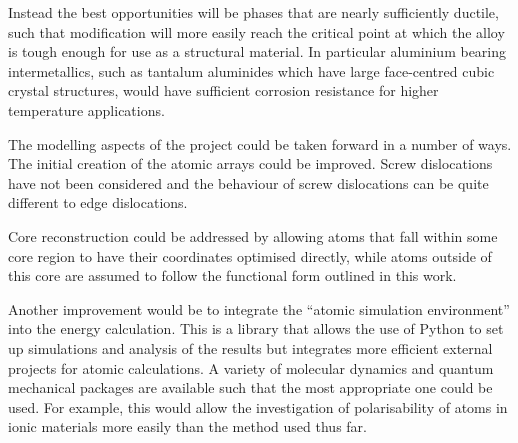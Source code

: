Instead the best opportunities will be phases that are nearly sufficiently ductile, such that modification will more easily reach the critical point at which the alloy is tough enough for use as a structural material. In particular aluminium bearing intermetallics, such as tantalum aluminides which have large face-centred cubic crystal structures, would have sufficient corrosion resistance for higher temperature applications.

The modelling aspects of the project could be taken forward in a number of ways. The initial creation of the atomic arrays could be improved. Screw dislocations have not been considered and the behaviour of screw dislocations can be quite different to edge dislocations. 

Core reconstruction could be addressed by allowing atoms that fall within some core region to have their coordinates optimised directly, while atoms outside of this core are assumed to follow the functional form outlined in this work.

Another improvement would be to integrate the ``atomic simulation environment'' into the energy calculation. This is a library that allows the use of Python to set up simulations and analysis of the results but integrates more efficient external projects for atomic calculations. A variety of molecular dynamics and quantum mechanical packages are available such that the most appropriate one could be used. For example, this would allow the investigation of polarisability of atoms in ionic materials more easily than the method used thus far.

